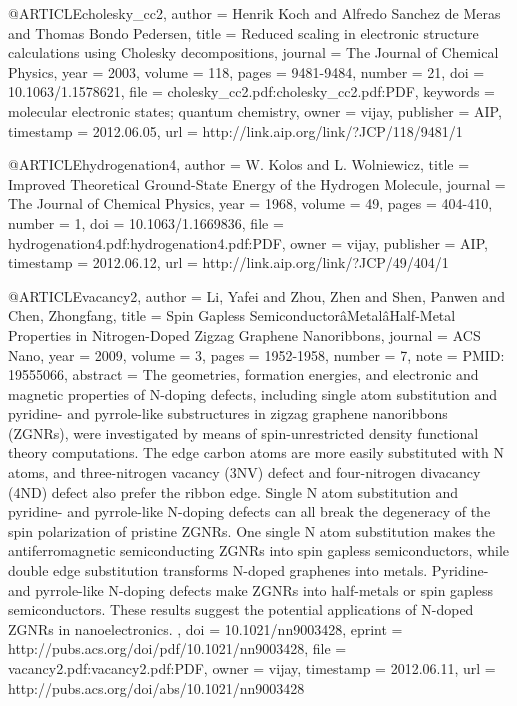 @ARTICLE{cholesky_cc2,
  author = {Henrik Koch and Alfredo Sanchez de Meras and Thomas Bondo Pedersen},
  title = {Reduced scaling in electronic structure calculations using Cholesky
	decompositions},
  journal = {The Journal of Chemical Physics},
  year = {2003},
  volume = {118},
  pages = {9481-9484},
  number = {21},
  doi = {10.1063/1.1578621},
  file = {cholesky_cc2.pdf:cholesky_cc2.pdf:PDF},
  keywords = {molecular electronic states; quantum chemistry},
  owner = {vijay},
  publisher = {AIP},
  timestamp = {2012.06.05},
  url = {http://link.aip.org/link/?JCP/118/9481/1}
}

@ARTICLE{hydrogenation4,
  author = {W. Kolos and L. Wolniewicz},
  title = {Improved Theoretical Ground-State Energy of the Hydrogen Molecule},
  journal = {The Journal of Chemical Physics},
  year = {1968},
  volume = {49},
  pages = {404-410},
  number = {1},
  doi = {10.1063/1.1669836},
  file = {hydrogenation4.pdf:hydrogenation4.pdf:PDF},
  owner = {vijay},
  publisher = {AIP},
  timestamp = {2012.06.12},
  url = {http://link.aip.org/link/?JCP/49/404/1}
}

@ARTICLE{vacancy2,
  author = {Li, Yafei and Zhou, Zhen and Shen, Panwen and Chen, Zhongfang},
  title = {Spin Gapless SemiconductorâMetalâHalf-Metal Properties in Nitrogen-Doped
	Zigzag Graphene Nanoribbons},
  journal = {ACS Nano},
  year = {2009},
  volume = {3},
  pages = {1952-1958},
  number = {7},
  note = {PMID: 19555066},
  abstract = { The geometries, formation energies, and electronic and magnetic properties
	of N-doping defects, including single atom substitution and pyridine-
	and pyrrole-like substructures in zigzag graphene nanoribbons (ZGNRs),
	were investigated by means of spin-unrestricted density functional
	theory computations. The edge carbon atoms are more easily substituted
	with N atoms, and three-nitrogen vacancy (3NV) defect and four-nitrogen
	divacancy (4ND) defect also prefer the ribbon edge. Single N atom
	substitution and pyridine- and pyrrole-like N-doping defects can
	all break the degeneracy of the spin polarization of pristine ZGNRs.
	One single N atom substitution makes the antiferromagnetic semiconducting
	ZGNRs into spin gapless semiconductors, while double edge substitution
	transforms N-doped graphenes into metals. Pyridine- and pyrrole-like
	N-doping defects make ZGNRs into half-metals or spin gapless semiconductors.
	These results suggest the potential applications of N-doped ZGNRs
	in nanoelectronics. },
  doi = {10.1021/nn9003428},
  eprint = {http://pubs.acs.org/doi/pdf/10.1021/nn9003428},
  file = {vacancy2.pdf:vacancy2.pdf:PDF},
  owner = {vijay},
  timestamp = {2012.06.11},
  url = {http://pubs.acs.org/doi/abs/10.1021/nn9003428}
}

